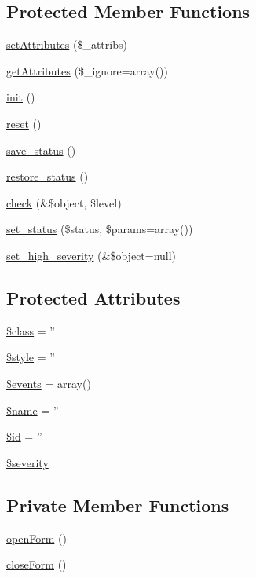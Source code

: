 \subsection*{Protected Member Functions}
\begin{DoxyCompactItemize}
\item 
\hyperlink{classBaseElement_aa623b042d23a5b77add8b3c452ec5855}{setAttributes} (\$\_\-attribs)
\item 
\hyperlink{classBaseElement_ae8237038633fc53db818f36da1940297}{getAttributes} (\$\_\-ignore=array())
\item 
\hyperlink{class__OWL_ae0ef3ded56e8a6b34b6461e5a721cd3e}{init} ()
\item 
\hyperlink{class__OWL_a2f2a042bcf31965194c03033df0edc9b}{reset} ()
\item 
\hyperlink{class__OWL_a9e49b9c76fbc021b244c6915ea536d71}{save\_\-status} ()
\item 
\hyperlink{class__OWL_a465eeaf40edd9f9c848841700c32ce55}{restore\_\-status} ()
\item 
\hyperlink{class__OWL_ad6f4f6946f40199dd0333cf219fa500e}{check} (\&\$object, \$level)
\item 
\hyperlink{class__OWL_aea912d0ede9b3c2a69b79072d94d4787}{set\_\-status} (\$status, \$params=array())
\item 
\hyperlink{class__OWL_a576829692a3b66e3d518853bf43abae3}{set\_\-high\_\-severity} (\&\$object=null)
\end{DoxyCompactItemize}
\subsection*{Protected Attributes}
\begin{DoxyCompactItemize}
\item 
\hyperlink{classBaseElement_a99976a8e967db92e7800309f359b0803}{\$class} = ''
\item 
\hyperlink{classBaseElement_a429a3d642dd95f30e1059ef29564b87d}{\$style} = ''
\item 
\hyperlink{classBaseElement_a02cebe45d277b4ff8f29db08bad371ba}{\$events} = array()
\item 
\hyperlink{classBaseElement_a30b8cff187a9de659a70daf287d66f45}{\$name} = ''
\item 
\hyperlink{classBaseElement_a11b6989c43b53869a09f5ce65aa55b45}{\$id} = ''
\item 
\hyperlink{class__OWL_ad26b40a9dbbacb33e299b17826f8327c}{\$severity}
\end{DoxyCompactItemize}
\subsection*{Private Member Functions}
\begin{DoxyCompactItemize}
\item 
\hyperlink{classForm_a94902cc2869e1608247d9204036af7d1}{openForm} ()
\item 
\hyperlink{classForm_a9bb2df9ed7b866b0dc4b29b3874c2a1a}{closeForm} ()
\end{DoxyCompactItemize}
